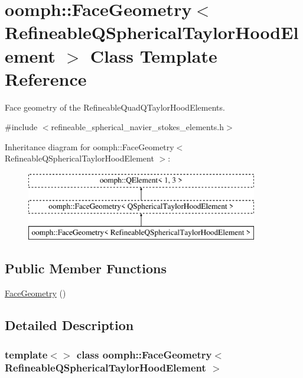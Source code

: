 \hypertarget{classoomph_1_1FaceGeometry_3_01RefineableQSphericalTaylorHoodElement_01_4}{}\section{oomph\+:\+:Face\+Geometry$<$ Refineable\+Q\+Spherical\+Taylor\+Hood\+Element $>$ Class Template Reference}
\label{classoomph_1_1FaceGeometry_3_01RefineableQSphericalTaylorHoodElement_01_4}


Face geometry of the Refineable\+Quad\+Q\+Taylor\+Hood\+Elements.  




{\ttfamily \#include $<$refineable\+\_\+spherical\+\_\+navier\+\_\+stokes\+\_\+elements.\+h$>$}

Inheritance diagram for oomph\+:\+:Face\+Geometry$<$ Refineable\+Q\+Spherical\+Taylor\+Hood\+Element $>$\+:\begin{figure}[H]
\begin{center}
\leavevmode
\includegraphics[height=3.000000cm]{classoomph_1_1FaceGeometry_3_01RefineableQSphericalTaylorHoodElement_01_4}
\end{center}
\end{figure}
\subsection*{Public Member Functions}
\begin{DoxyCompactItemize}
\item 
\hyperlink{classoomph_1_1FaceGeometry_3_01RefineableQSphericalTaylorHoodElement_01_4_a7782322a118e0e9d6080cefa5dcc04ba}{Face\+Geometry} ()
\end{DoxyCompactItemize}


\subsection{Detailed Description}
\subsubsection*{template$<$$>$\newline
class oomph\+::\+Face\+Geometry$<$ Refineable\+Q\+Spherical\+Taylor\+Hood\+Element $>$}

